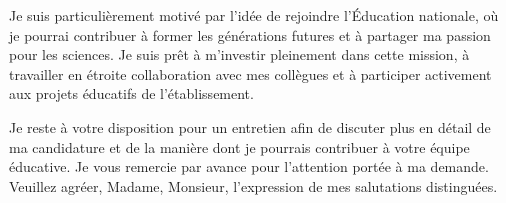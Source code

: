 \documentclass[10.7pt,a4paper]{lettre}
\begin{document}
\begin{letter}
Je suis particulièrement motivé par l'idée de rejoindre l'Éducation nationale, où je pourrai contribuer à former les générations futures et à partager ma passion pour les sciences. Je suis prêt à m'investir pleinement dans cette mission, à travailler en étroite collaboration avec mes collègues et à participer activement aux projets éducatifs de l'établissement.
\hspace{1em}
\closing{\hspace{1em}
Je reste à votre disposition pour un entretien afin de discuter plus en détail de ma candidature et de la manière dont je pourrais contribuer à votre équipe éducative. Je vous remercie par avance pour l'attention portée à ma demande.
Veuillez agréer, Madame, Monsieur, l'expression de mes salutations distinguées.
}
\end{letter}
\end{document}

